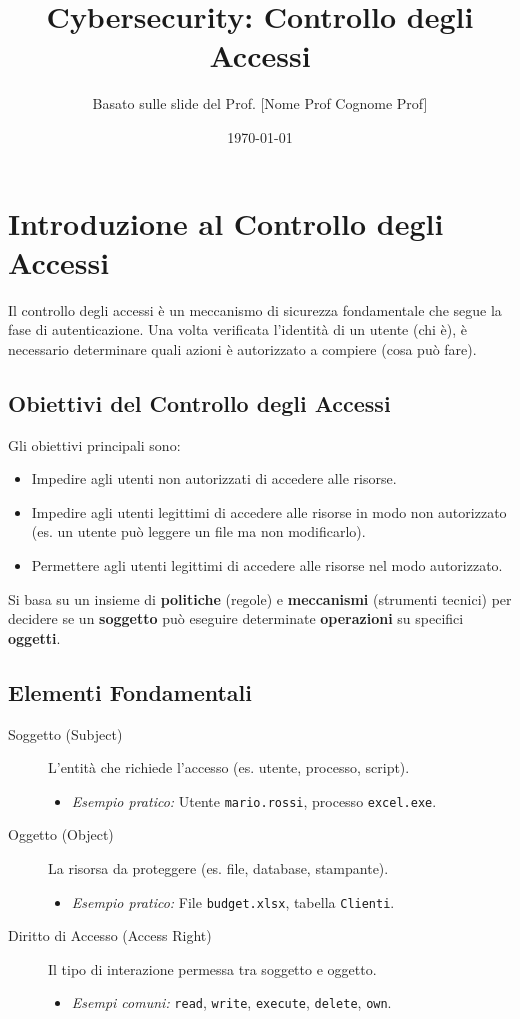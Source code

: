 \documentclass{article}
\title{Cybersecurity: Controllo degli Accessi}
\author{Basato sulle slide del Prof. [Nome Prof Cognome Prof]} %
\date{\today}
\begin{document}
\maketitle
\tableofcontents
\newpage

\section{Introduzione al Controllo degli Accessi}
Il controllo degli accessi è un meccanismo di sicurezza fondamentale che segue la fase di autenticazione. Una volta verificata l'identità di un utente (chi è), è necessario determinare quali azioni è autorizzato a compiere (cosa può fare).

\subsection{Obiettivi del Controllo degli Accessi}
Gli obiettivi principali sono:
\begin{itemize}
    \item Impedire agli utenti non autorizzati di accedere alle risorse.
    \item Impedire agli utenti legittimi di accedere alle risorse in modo non autorizzato (es. un utente può leggere un file ma non modificarlo).
    \item Permettere agli utenti legittimi di accedere alle risorse nel modo autorizzato.
\end{itemize}
Si basa su un insieme di \textbf{politiche} (regole) e \textbf{meccanismi} (strumenti tecnici) per decidere se un \textbf{soggetto} può eseguire determinate \textbf{operazioni} su specifici \textbf{oggetti}.

\subsection{Elementi Fondamentali}
\begin{description}
    \item[Soggetto (Subject)] L'entità che richiede l'accesso (es. utente, processo, script).
        \begin{itemize}
            \item \textit{Esempio pratico:} Utente \texttt{mario.rossi}, processo \texttt{excel.exe}.
        \end{itemize}
    \item[Oggetto (Object)] La risorsa da proteggere (es. file, database, stampante).
        \begin{itemize}
            \item \textit{Esempio pratico:} File \texttt{budget.xlsx}, tabella \texttt{Clienti}.
        \end{itemize}
    \item[Diritto di Accesso (Access Right)] Il tipo di interazione permessa tra soggetto e oggetto.
        \begin{itemize}
            \item \textit{Esempi comuni:} \texttt{read}, \texttt{write}, \texttt{execute}, \texttt{delete}, \texttt{own}.
        \end{itemize}
\end{description}
\end{document}
